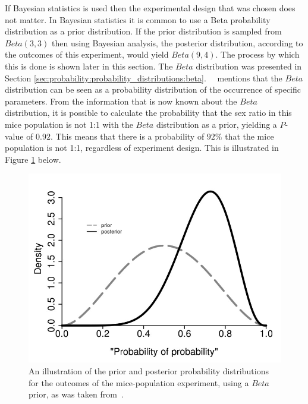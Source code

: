 If Bayesian statistics is used then the experimental design that was chosen does not matter. In Bayesian statistics it is common to use a Beta probability distribution as a prior distribution. If the prior distribution is sampled from $Beta(3,3)$ then using Bayesian analysis, the posterior distribution, according to the outcomes of this experiment, would yield $Beta(9,4)$. The process by which this is done is shown later in this section. The $Beta$ distribution was presented in Section \ref{sec:probability:probability_distributions:beta}.~\citeauthor{ref:hackenberger:2019}~\cite{ref:hackenberger:2019} mentions that the $Beta$ distribution can be seen as a probability distribution of the occurrence of specific parameters. From the information that is now known about the $Beta$ distribution, it is possible to calculate the probability that the sex ratio in this mice population is not 1:1 with the $Beta$ distribution as a prior, yielding a $P$-value of $0.92$. This means that there is a probability of $92\%$ that the mice population is not 1:1, regardless of experiment design. This is illustrated in Figure \ref{fig:probability:bayesian_statistics:mouse_distributions} below.

\begin{figure}[htbp]
      \includegraphics[width=\textwidth]{images/mouse_experiment_distributions.jpg}
      \caption{An illustration of the prior and posterior probability distributions for the outcomes of the mice-population experiment, using a $Beta$ prior, as was taken from~\cite{ref:hackenberger:2019}.}
      \label{fig:probability:bayesian_statistics:mouse_distributions}
\end{figure}


